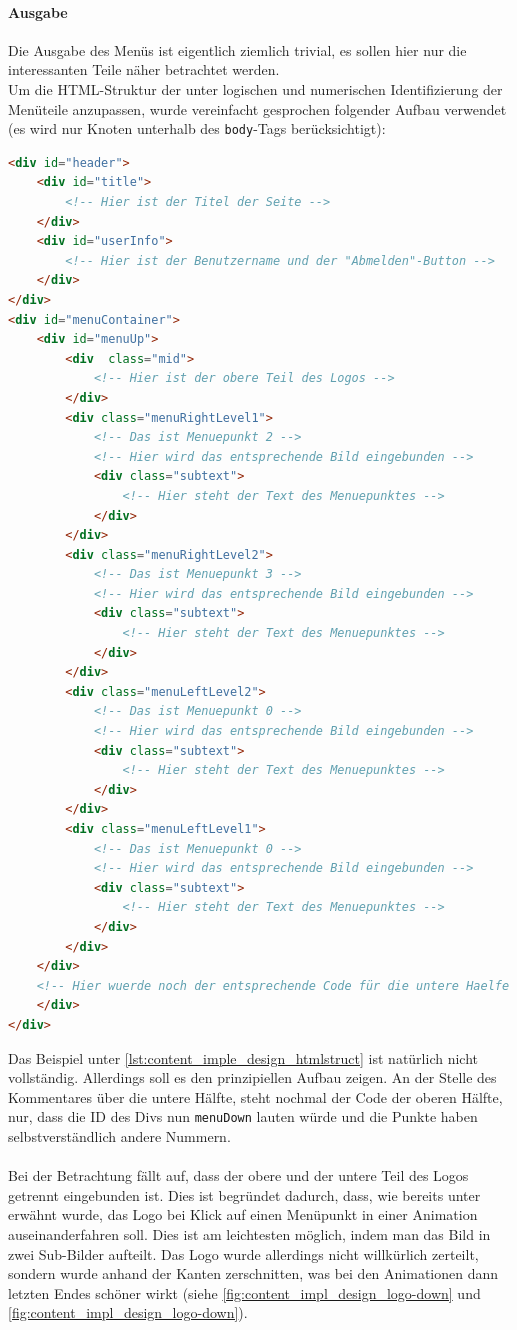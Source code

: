 \paragraph{Ausgabe\\}
Die Ausgabe des Menüs ist eigentlich ziemlich trivial, es sollen hier nur die interessanten Teile näher betrachtet werden.\\
Um die HTML-Struktur der unter logischen und numerischen Identifizierung der Menüteile anzupassen, wurde vereinfacht gesprochen folgender Aufbau verwendet (es wird nur Knoten unterhalb des \texttt{body}-Tags berücksichtigt):
\begin{lstlisting}[style=custom, language=html,  caption={Grundsätzliche HTML-Struktur der Menüs},label={lst:content_imple_design_htmlstruct}]
<div id="header">
	<div id="title">
		<!-- Hier ist der Titel der Seite -->
	</div>
	<div id="userInfo">
		<!-- Hier ist der Benutzername und der "Abmelden"-Button -->
	</div>
</div>
<div id="menuContainer">
	<div id="menuUp">
		<div  class="mid">
			<!-- Hier ist der obere Teil des Logos -->
		</div>
		<div class="menuRightLevel1">
			<!-- Das ist Menuepunkt 2 -->
			<!-- Hier wird das entsprechende Bild eingebunden -->
			<div class="subtext">
				<!-- Hier steht der Text des Menuepunktes -->
			</div>
		</div>
		<div class="menuRightLevel2">
			<!-- Das ist Menuepunkt 3 -->
			<!-- Hier wird das entsprechende Bild eingebunden -->
			<div class="subtext">
				<!-- Hier steht der Text des Menuepunktes -->
			</div>
		</div>
		<div class="menuLeftLevel2">
			<!-- Das ist Menuepunkt 0 -->
			<!-- Hier wird das entsprechende Bild eingebunden -->
			<div class="subtext">
				<!-- Hier steht der Text des Menuepunktes -->
			</div>
		</div>
		<div class="menuLeftLevel1">
			<!-- Das ist Menuepunkt 0 -->
			<!-- Hier wird das entsprechende Bild eingebunden -->
			<div class="subtext">
				<!-- Hier steht der Text des Menuepunktes -->
			</div>
		</div>
	</div>
	<!-- Hier wuerde noch der entsprechende Code für die untere Haelfe kommen -->
	</div>
</div>
\end{lstlisting}
Das Beispiel unter \autoref{lst:content_imple_design_htmlstruct} ist natürlich nicht vollständig. Allerdings soll es den prinzipiellen Aufbau zeigen. An der Stelle des Kommentares über die untere Hälfte, steht nochmal der Code der oberen Hälfte, nur, dass die ID des Divs nun \texttt{menuDown} lauten würde und die Punkte haben selbstverständlich andere Nummern.\\
\\
\newpage
Bei der Betrachtung fällt auf, dass der obere und der untere Teil des Logos getrennt eingebunden ist. Dies ist begründet dadurch, dass, wie bereits unter  erwähnt wurde, das Logo bei Klick auf einen Menüpunkt in einer Animation auseinanderfahren soll. Dies ist am leichtesten möglich, indem man das Bild in zwei Sub-Bilder aufteilt. Das Logo wurde allerdings nicht willkürlich zerteilt, sondern wurde anhand der Kanten zerschnitten, was bei den Animationen dann letzten Endes schöner wirkt (siehe \autoref{fig:content_impl_design_logo-down} und \autoref{fig:content_impl_design_logo-down}).\\
